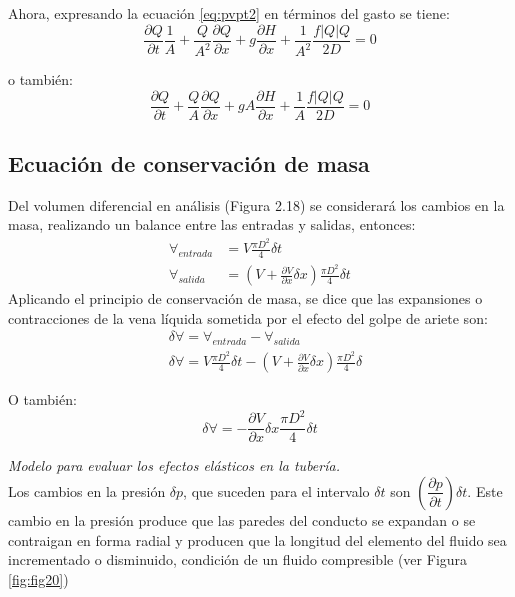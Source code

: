 \documentclass[letterpaper]{report}
\begin{document}
Ahora, expresando la ecuación \ref{eq:pvpt2} en términos del gasto se tiene:
\begin{equation*}
\frac{\partial Q}{\partial t}\frac{1}{A}+\frac{Q}{A^2}\frac{\partial Q}{\partial x}+g\frac{\partial H}{\partial x}+\frac{1}{A^2}\frac{f\left|Q\right|Q}{2D}=0
\end{equation*}

o también:
\begin{equation}
\frac{\partial Q}{\partial t}+\frac{Q}{A}\frac{\partial Q}{\partial x}+gA\frac{\partial H}{\partial x}+\frac{1}{A}\frac{f\left|Q\right|Q}{2D}=0
\label{eq:continuidad}
\end{equation}

\subsection{Ecuación de conservación de masa}
Del volumen diferencial en análisis (Figura 2.18)  se considerará los cambios en la masa, realizando un balance entre las entradas y salidas, 
entonces:
\begin{align}
	\forall_{entrada} &= V\frac{\pi D^2}{4}\delta t \\
	\forall_{salida} &=\left(V+\frac{\partial V}{\partial x}\delta x\right)\frac{\pi D^2}{4}\delta t
\end{align}
Aplicando el principio de conservación de masa, se dice que las expansiones o contracciones de la vena líquida sometida por el efecto del golpe de ariete 
son:
\begin{align*}
	&\delta\forall = \forall_{entrada}-\forall_{salida}\\
	&\delta\forall = V\frac{\pi D^2}{4}\delta t-\left(V+\frac{\partial V}{\partial x}\delta x\right)\frac{\pi D^2}{4}\delta
\end{align*}

O también:
\begin{equation}
	\delta\forall=-\frac{\partial V}{\partial x}\delta x\frac{\pi D^2}{4}\delta t
\label{eq:todoA}
\end{equation}

\emph{Modelo para evaluar los efectos elásticos en la tubería.}\\ 
Los cambios en la presión $\delta p$, que suceden para el intervalo $\delta t$ son $\left (\dfrac{\partial p}{\partial t}\right )\delta t$. Este cambio en la presión 
produce que las paredes del conducto se expandan o se contraigan en forma radial y producen que la longitud del elemento del fluido sea incrementado o 
disminuido, condición de un fluido compresible (ver Figura \ref{fig:fig20})\bigskip
\end{document}

